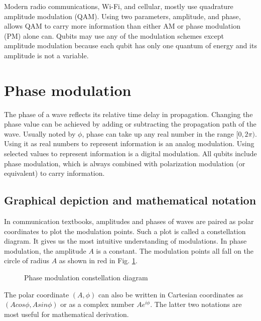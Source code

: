 \documentclass[oneside, letter, 12pt]{book}
\begin{document}
Modern radio communications, Wi-Fi, and cellular, mostly use quadrature amplitude modulation (QAM). Using two parameters, amplitude, and phase, allows QAM to carry more information than either AM or phase modulation (PM) alone can. Qubits may use any of the modulation schemes except amplitude modulation because each qubit has only one quantum of energy and its amplitude is not a variable.

\section{Phase modulation}
The phase of a wave reflects its relative time delay in propagation. Changing the phase value can be achieved by adding or subtracting the propagation path of the wave. Usually noted by $\phi$, phase can take up any real number in the range $[0, 2 \pi)$. Using it as real numbers to represent information is an analog modulation. Using selected values to represent information is a digital modulation. All qubits include phase modulation, which is always combined with polarization modulation (or equivalent) to carry information.

\subsection{Graphical depiction and mathematical notation}
In communication textbooks, amplitudes and phases of waves are paired as polar coordinates to plot the modulation points. Such a plot is called a constellation diagram. It gives us the most intuitive understanding of modulations. In phase modulation, the amplitude $A$ is a constant. The modulation points all fall on the circle of radius $A$ as shown in red in Fig. \ref{PM}.

\begin{figure}[h]\label{PM}
\caption{Phase modulation constellation diagram}
\end{figure}

The polar coordinate $(A, \phi)$ can also be written in Cartesian coordinates as $(A cos\phi, A sin\phi)$ or as a complex number $A e^{i\phi}$. The latter two notations are most useful for mathematical derivation.
\end{document}
